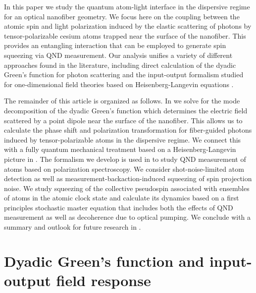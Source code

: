 \documentclass[aps,pra,twocolumn]{revtex4-1} %
\begin{document}
In this paper we study the quantum atom-light interface in the dispersive regime {\color{blue} for an optical nanofiber geometry.}  We focus here on the coupling between the atomic spin and light polarization induced by the elastic scattering of photons by tensor-polarizable cesium atoms trapped near the surface of the nanofiber.  This provides an entangling interaction {\color{blue} that can be employed to generate} spin squeezing via QND measurement.  Our analysis unifies a variety of different approaches found in the literature, including direct calculation of the dyadic Green's function for photon scattering \cite{sakoda_optical_1996, dung_spontaneous_2000, sondergaard_general_2001, klimov_spontaneous_2004, wubs_multiple-scattering_2004, fussell_decay_2005, manga_rao_single_2007, dzsotjan_quantum_2010} and the input-output formalism studied for one-dimensional field theories based on Heisenberg-Langevin equations \cite{gardiner_input_1985, blow_continuum_1990, shen_coherent_2005, le_kien_spontaneous_2005, le_kien_correlations_2008, fan_input-output_2010}.

The remainder of this article is organized as follows.  
In  we solve for the mode decomposition of the dyadic Green's function which determines the electric field scattered by a point dipole near the surface of the nanofiber.  
This allows us to calculate the phase shift and polarization transformation for fiber-guided photons induced by tensor-polarizable atoms in the dispersive regime.  
We connect this with a fully quantum mechanical treatment based on a Heisenberg-Langevin picture in .  
The formalism we develop is used in  to study QND measurement of atoms based on polarization spectroscopy. 
We consider shot-noise-limited atom detection as well as measurement-backaction-induced squeezing of spin projection noise.  
We study squeezing of the collective pseudospin associated with ensembles of atoms in the atomic clock state and calculate its dynamics based on a first principles stochastic master equation that includes both the effects of QND measurement as well as decoherence due to optical pumping.  
We conclude with a summary and outlook for future research in .  


\section{Dyadic Green's function and input-output field response} \label{Sec::GreensFunction}
\end{document}
